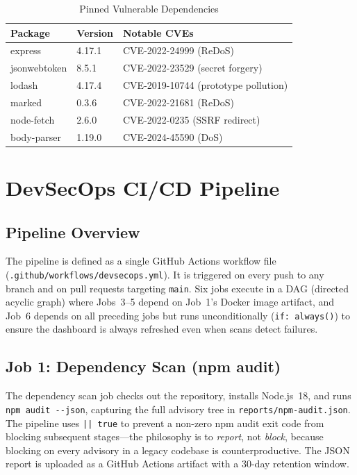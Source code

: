 \documentclass[10pt,conference]{IEEEtran}
\begin{document}
\begin{table}[t]
  \caption{Pinned Vulnerable Dependencies}
  \label{tab:deps}
  \centering
  \scriptsize
  \begin{tabular}{@{}lll@{}}
    \toprule
    Package & Version & Notable CVEs \\
    \midrule
    express      & 4.17.1 & CVE-2022-24999 (ReDoS) \\
    jsonwebtoken & 8.5.1  & CVE-2022-23529 (secret forgery) \\
    lodash       & 4.17.4 & CVE-2019-10744 (prototype pollution) \\
    marked       & 0.3.6  & CVE-2022-21681 (ReDoS) \\
    node-fetch   & 2.6.0  & CVE-2022-0235 (SSRF redirect) \\
    body-parser  & 1.19.0 & CVE-2024-45590 (DoS) \\
    \bottomrule
  \end{tabular}
\end{table}

\section{DevSecOps CI/CD Pipeline}

\subsection{Pipeline Overview}

The pipeline is defined as a single GitHub Actions workflow file
(\texttt{.github/workflows/devsecops.yml}).
It is triggered on every push to any branch and on pull requests targeting
\texttt{main}.
Six jobs execute in a DAG (directed acyclic graph) where Jobs~3--5 depend on
Job~1's Docker image artifact, and Job~6 depends on all preceding jobs but
runs unconditionally (\texttt{if: always()}) to ensure the dashboard is always
refreshed even when scans detect failures.

\subsection{Job 1: Dependency Scan (npm audit)}

The dependency scan job checks out the repository, installs Node.js~18, and
runs \texttt{npm audit -{}-json}, capturing the full advisory tree in
\texttt{reports/npm-audit.json}.
The pipeline uses \texttt{|| true} to prevent a non-zero npm audit exit code
from blocking subsequent stages—the philosophy is to \emph{report}, not
\emph{block}, because blocking on every advisory in a legacy codebase is
counterproductive.
The JSON report is uploaded as a GitHub Actions artifact with a 30-day
retention window.
\end{document}
